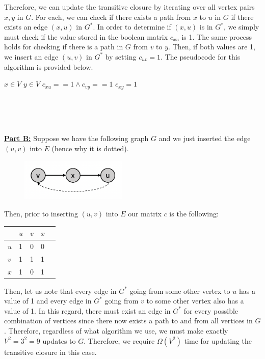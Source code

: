 \documentclass[11pt]{article}
\begin{document}
Therefore, we can update the transitive closure by iterating over all vertex pairs $x,y$ in $G$. For each, we can check if there exists a path from $x$ to $u$ in $G$ if there exists an edge $(x,u)$ in $G^*$. In order to determine if $(x,u)$ is in $G^*$, we simply must check if the value stored in the boolean matrix $c_{xu}$ is 1. The same process holds for checking if there is a path in $G$ from $v$ to $y$. Then, if both values are 1, we insert an edge $(u,v)$ in $G^*$ by setting $c_{uv} = 1$. The pseudocode for this algorithm is provided below.

\begin{codebox}
\li \For $x \in V$ \Do
\li     \For $y \in V$ \Do
\li         \If $c_{xu} == 1 \land c_{vy} == 1$ \Do
\li             $c_{xy} = 1$
            \End
        \End
    \End
\end{codebox}\\

\\~

\underline{\textbf{Part B:}} Suppose we have the following graph $G$ and we just inserted the edge $(u,v)$ into $E$ (hence why it is dotted).

\begin{figure}[ht]
    \includegraphics[width=2in]{prob4graph.png}
\end{figure}

Then, prior to inserting $(u,v)$ into $E$ our matrix $c$ is the following:


\begin{table}[H]
\begin{tabular}{l|llll}
  & $u$ & $v$ & $x$ &  \\
  \hline
$u$ & 1 & 0 & 0 &  \\
$v$ & 1 & 1 & 1 &  \\
$x$ & 1 & 0 & 1 &
\end{tabular}
\end{table}

Then, let us note that every edge in $G^*$ going from some other vertex to $u$ has a value of 1 and every edge in $G^*$ going from $v$ to some other vertex also has a value of 1. In this regard, there must exist an edge in $G^*$ for every possible combination of vertices since there now exists a path to and from all vertices in $G$. Therefore, regardless of what algorithm we use, we must make exactly $V^2 = 3^2 = 9$ updates to $G$. Therefore, we require $\Omega(V^2)$ time for updating the transitive closure in this case.\\
\end{document}
